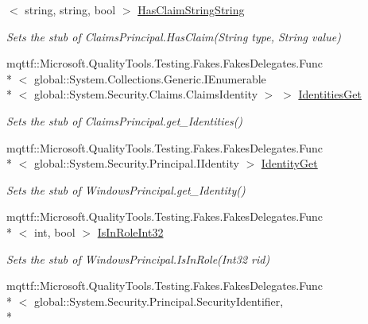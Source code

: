 \begin{DoxyCompactItemize}
$<$ string, string, bool $>$ \hyperlink{class_system_1_1_security_1_1_principal_1_1_fakes_1_1_stub_windows_principal_ab8717b9d34aff5e4708415c33baef074}{Has\-Claim\-String\-String}
\begin{DoxyCompactList}\small\item\em Sets the stub of Claims\-Principal.\-Has\-Claim(\-String type, String value)\end{DoxyCompactList}\item 
mqttf\-::\-Microsoft.\-Quality\-Tools.\-Testing.\-Fakes.\-Fakes\-Delegates.\-Func\\*
$<$ global\-::\-System.\-Collections.\-Generic.\-I\-Enumerable\\*
$<$ global\-::\-System.\-Security.\-Claims.\-Claims\-Identity $>$ $>$ \hyperlink{class_system_1_1_security_1_1_principal_1_1_fakes_1_1_stub_windows_principal_a1a0ef38803110d5320a7f306072d8606}{Identities\-Get}
\begin{DoxyCompactList}\small\item\em Sets the stub of Claims\-Principal.\-get\-\_\-\-Identities()\end{DoxyCompactList}\item 
mqttf\-::\-Microsoft.\-Quality\-Tools.\-Testing.\-Fakes.\-Fakes\-Delegates.\-Func\\*
$<$ global\-::\-System.\-Security.\-Principal.\-I\-Identity $>$ \hyperlink{class_system_1_1_security_1_1_principal_1_1_fakes_1_1_stub_windows_principal_a67ea0acc58563de8fdec8e5cfc05a758}{Identity\-Get}
\begin{DoxyCompactList}\small\item\em Sets the stub of Windows\-Principal.\-get\-\_\-\-Identity()\end{DoxyCompactList}\item 
mqttf\-::\-Microsoft.\-Quality\-Tools.\-Testing.\-Fakes.\-Fakes\-Delegates.\-Func\\*
$<$ int, bool $>$ \hyperlink{class_system_1_1_security_1_1_principal_1_1_fakes_1_1_stub_windows_principal_afcb4a75878785d98c728887bde81405f}{Is\-In\-Role\-Int32}
\begin{DoxyCompactList}\small\item\em Sets the stub of Windows\-Principal.\-Is\-In\-Role(\-Int32 rid)\end{DoxyCompactList}\item 
mqttf\-::\-Microsoft.\-Quality\-Tools.\-Testing.\-Fakes.\-Fakes\-Delegates.\-Func\\*
$<$ global\-::\-System.\-Security.\-Principal.\-Security\-Identifier, \\*

\end{DoxyCompactItemize}
